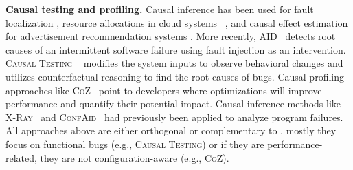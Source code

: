 

\noindent\textbf{Causal testing and profiling.} 
Causal inference has been used for fault localization \cite{baah2010causal,feyzi2019inforence}, resource allocations in cloud systems~ \cite{geiger2016causal}, and causal effect estimation for advertisement recommendation systems \cite{bottou2013counterfactual}. More recently, \textsc{AID}~\cite{fariha2020causality} detects root causes of an intermittent software failure using fault injection as an intervention. \textsc{Causal Testing} ~\cite{johnson2020causal} modifies the system inputs to observe behavioral changes and utilizes counterfactual reasoning to find the root causes of bugs. Causal profiling approaches like \textsc{CoZ}~\cite{curtsinger2015coz} point to developers where optimizations will improve performance and quantify their potential impact. Causal inference methods like \textsc{X-Ray}~\cite{attariyan2012x} and \textsc{ConfAid}~\cite{attariyan2010automating} had previously been applied to analyze program failures. All approaches above are either orthogonal or complementary to \ourapproach, mostly they focus on functional bugs (e.g., \textsc{Causal Testing}) or if they are performance-related, they are not configuration-aware (e.g., \textsc{CoZ}). 





